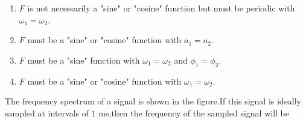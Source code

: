 \begin{enumerate}
    \item$F$ is not necessarily a "sine" or "cosine" function but must be periodic with $\omega_1 = \omega_2$.
    \item $F$ must be a "sine" or "cosine" function with $a_1 = a_2$.
    \item $F$ must be a "sine" function with $\omega_1 = \omega_2$ and $\phi_1 = \phi_2$.
    \item $F$ must be a "sine" or "cosine" function with $\omega_1 = \omega_2$.\\
\end{enumerate}
\item The frequency spectrum of a signal is shown in the figure.If this signal is ideally sampled at intervals of $1$ ms,then the frequency of the sampled signal will be
	\begin{figure}[!ht]
\centering
{}%
\end{figure}
